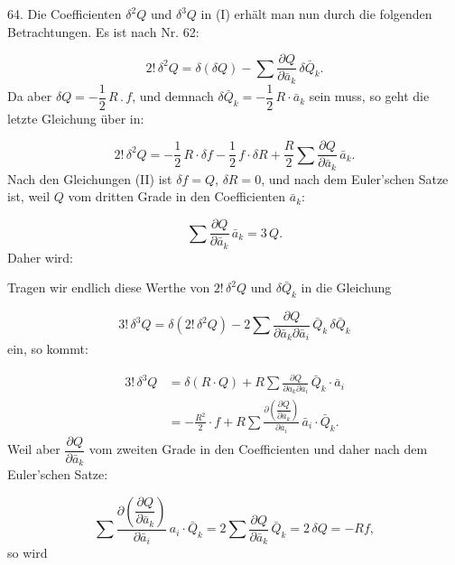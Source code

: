 64. Die Coefficienten $\delta^2 Q$ und $\delta^3 Q$ in (I) erhält man nun durch die folgenden Betrachtungen. Es ist nach Nr. 62:

\[
2!\,\delta^2 Q = \delta(\delta Q) - \sum \frac{\partial Q}{\partial \bar a_k}\,\delta \bar Q_k .
\]
Da aber $\delta Q = -\dfrac{1}{2}\,R\,.\,f$, und demnach $\delta \bar Q_k = -\dfrac{1}{2}\,R \cdot \bar a_k$ sein muss, so geht die letzte Gleichung über in:

\[
2!\,\delta^2 Q = -\frac{1}{2}\,R \cdot \delta f - \frac{1}{2}\,f \cdot \delta R + \frac{R}{2} \sum \frac{\partial Q}{\partial \bar a_k}\, \bar a_k .
\]
Nach den Gleichungen (II) ist $\delta f = Q$, $\delta R = 0$, und nach dem Euler'schen Satze ist, weil $Q$ vom dritten Grade in den Coefficienten $\bar a_k$:

\[
\sum \frac{\partial Q}{\partial \bar a_k}\, \bar a_k = 3\,Q .
\]
Daher wird:

Tragen wir endlich diese Werthe von $2!\,\delta^2 Q$ und $\delta \bar Q_k$ in die Gleichung

\[
3!\,\delta^3 Q = \delta(2!\,\delta^2 Q) - 2 \sum \frac{\partial Q}{\partial \bar a_k \partial \bar a_i}\, \bar Q_k\, \delta \bar Q_k
\]
ein, so kommt:

\[
\begin{aligned}
3!\,\delta^3 Q &= \delta(R \cdot Q) + R \sum \frac{\partial Q}{\partial \bar a_k \partial \bar a_i}\, \bar Q_k \cdot \bar a_i\\[4pt]
&= -\frac{R^2}{2}\cdot f + R \sum \frac{\partial\!\left(\dfrac{\partial Q}{\partial \bar a_k}\right)}{\partial \bar a_i}\, \bar a_i \cdot \bar Q_k .
\end{aligned}
\]
Weil aber $\dfrac{\partial Q}{\partial \bar a_k}$ vom zweiten Grade in den Coefficienten und daher nach dem Euler'schen Satze:


\[
\sum \frac{\partial\!\left(\dfrac{\partial Q}{\partial \bar a_k}\right)}{\partial \bar a_i}\, a_i \cdot \bar Q_k = 2 \sum \frac{\partial Q}{\partial \bar a_k}\, \bar Q_k = 2\,\delta Q = -R f,
\]
so wird

